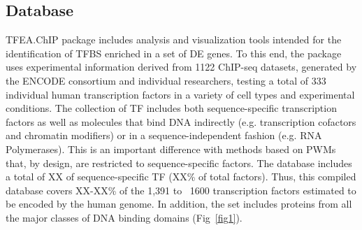 \documentclass[10pt,letterpaper]{article}
\begin{document}
	\subsection*{Database}
	TFEA.ChIP package includes analysis and visualization tools intended for the identification of TFBS enriched in a set of DE genes. To this end, the package uses experimental information derived from 1122 ChIP-seq datasets, generated by the ENCODE consortium and individual researchers, testing a total of 333 individual human transcription factors in a variety of cell types and experimental conditions. The collection of TF includes both sequence-specific transcription factors as well as molecules that bind DNA indirectly (e.g. transcription cofactors and chromatin modifiers) or in a sequence-independent fashion (e.g. RNA Polymerases). This is an important difference with methods based on PWMs that, by design, are restricted to sequence-specific factors. The database includes a total of XX of sequence-specific TF (XX\% of total factors). Thus, this compiled database covers XX-XX\% of the 1,391\cite{TFcensus} to ~1600 \cite{Lambert2018} transcription factors estimated to be encoded by the human genome. In addition, the set includes proteins from all the major classes of DNA binding domains (Fig~\ref{fig1}).
	
	
\end{document}
